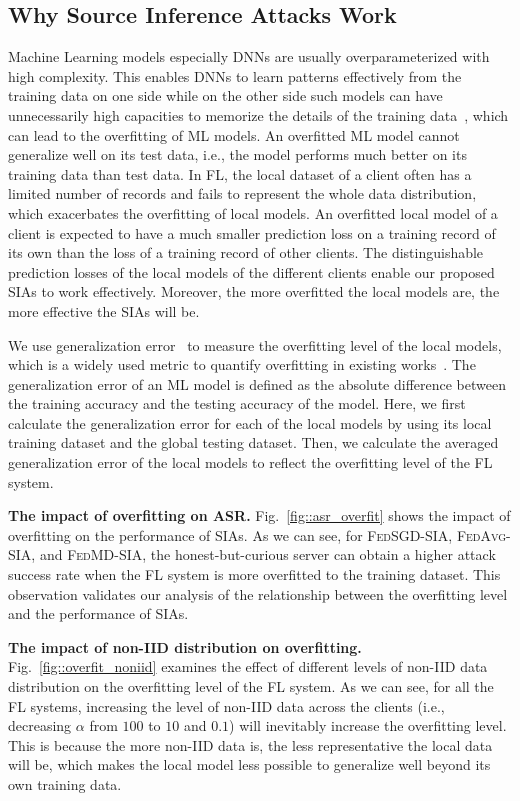 \documentclass[10pt,journal,compsoc]{IEEEtran}
\newcommand*\fedavg{\textsc{FedAvg-SIA}}
\newcommand*\fedsgd{\textsc{FedSGD-SIA}}
\newcommand*\fedmd{\textsc{FedMD-SIA}}
\begin{document}
\subsection{Why Source Inference Attacks Work} \label{sec::why}
Machine Learning models especially DNNs are usually overparameterized with high complexity. This enables DNNs to learn patterns effectively from the training data on one side while on the other side such models can have unnecessarily high capacities to memorize the details of the training data~\cite{carlini2019secret,song2017machine,zhang2021understanding}, which can lead to the overfitting of ML models. An overfitted ML model cannot generalize well on its test data, {i.e.,} the model performs much better on its training data than test data. In FL, the local dataset of a client often has a limited number of records and fails to represent the whole data distribution, which exacerbates the overfitting of local models. An overfitted local model of a client is expected to have a much smaller prediction loss on a training record of its own than the loss of a training record of other clients. The distinguishable prediction losses of the local models of the different clients enable our proposed SIAs to work effectively. Moreover, the more overfitted the local models are, the more effective the SIAs will be.

We use generalization error~\cite{hardt2016train} to measure the overfitting level of the local models, which is a widely used metric to quantify overfitting in existing works~\cite{hu2022membership}. The generalization error of an ML model is defined as the absolute difference between the training accuracy and the testing accuracy of the model. Here, we first calculate the generalization error for each of the local models by using its local training dataset and the global testing dataset. Then, we calculate the averaged generalization error of the local models to reflect the overfitting level of the FL system.

\noindent \textbf{The impact of overfitting on ASR. \;} Fig.~\ref{fig::asr_overfit} shows the impact of overfitting on the performance of SIAs. As we can see, for \fedsgd, \fedavg, \;and \fedmd, the honest-but-curious server can obtain a higher attack success rate when the FL system is more overfitted to the training dataset. This observation validates our analysis of the relationship between the overfitting level and the performance of SIAs.

\noindent \textbf{The impact of non-IID distribution on overfitting. \;} Fig.~\ref{fig::overfit_noniid} examines the effect of different levels of non-IID data distribution on the overfitting level of the FL system. As we can see, for all the FL systems, increasing the level of non-IID data across the clients ({i.e.,} decreasing $\alpha$ from $100$ to $10$ and $0.1$) will inevitably increase the overfitting level. This is because the more non-IID data is, the less representative the local data will be, which makes the local model less possible to generalize well beyond its own training data.
\end{document}
